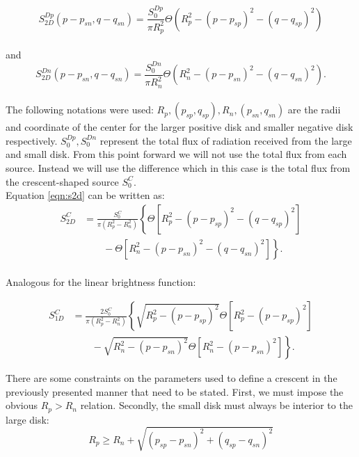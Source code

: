 \documentclass[usenatbib]{mn2e}
\begin{document}
\begin{equation}
 S_{2D}^{Dp}(p-p_{sn}, q-q_{sn}) = \frac{S_0^{Dp}}{\pi R_p^2} \Theta \left( R_p^2 - \left( p-p_{sp} \right)^2 - \left( q-q_{sp} \right)^2 \right)
\end{equation}
\\
and
\begin{equation}
 S_{2D}^{Dn}(p-p_{sn}, q-q_{sn}) = \frac{S_0^{Dn}}{\pi R_n^2} \Theta \left( R_n^2 - \left( p-p_{sn} \right)^2 - \left( q-q_{sn} \right)^2 \right).
\end{equation}
\\
The following notations were used: $R_p, (p_{sp}, q_{sp}), R_n, (p_{sn},q_{sn})$ are the radii 
and coordinate of the center for the larger positive disk and smaller negative disk respectively. 
$S_0^{Dp},S_0^{Dn}$ represent the total flux of radiation received from the large and small disk. 
From this point forward we will not use the total flux from each source. Instead we will 
use the difference which in this case is the total flux from the crescent-shaped source $S_0^C$. \\
Equation \ref{eqn:s2d} can be written as:\\

\begin{align}
 S_{2D}^C &= \frac{S_0^C}{\pi \left(R_p^2-R_n^2 \right)} \left\{ \Theta \left[ R_p^2 - \left( p-p_{sp} \right)^2 - \left( q-q_{sp} \right)^2 \right] \right.\nonumber\\
 &\qquad \left. {} -  \Theta \left[ R_n^2 - \left( p-p_{sn} \right)^2 - \left( q-q_{sn} \right)^2 \right] \right\}.
\end{align}
\\
Analogous for the linear brightness function:

\begin{align}
 S_{1D}^C &= \frac{2 S_0^C}{\pi \left(R_p^2-R_n^2 \right)} \left\{ \sqrt{R_p^2 - (p-p_{sp})^2}  \Theta \left[ R_p^2 - \left( p-p_{sp} \right)^2 \right] \right.\nonumber\\
 &\qquad \left. {} - \sqrt{R_n^2 - (p-p_{sn})^2 } \Theta \left[ R_n^2 - \left( p-p_{sn} \right)^2 \right] \right\}.
\label{eqn:s1_d}
\end{align}


There are some constraints on the parameters used to define a crescent in the previously 
presented manner that need to be stated. First, we must impose the obvious $R_p > R_n$ relation. Secondly, 
the small disk must always be interior to the large disk:
\begin{equation}
 R_p \ge R_n + \sqrt{\left(p_{sp} - p_{sn} \right)^2 + \left(q_{sp} - q_{sn} \right)^2}
\end{equation}
\end{document}

